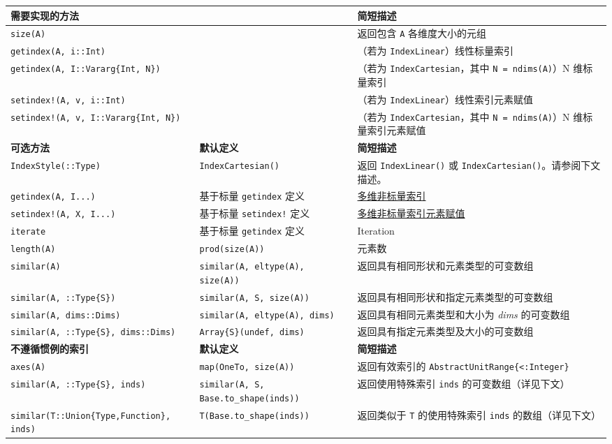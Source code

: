 \begin{table}[h]

\begin{tabulary}{\linewidth}{|L|L|L|}
\hline
需要实现的方法 &  & 简短描述 \\
\hline
\texttt{size(A)} &  & 返回包含 \texttt{A} 各维度大小的元组 \\
\hline
\texttt{getindex(A, i::Int)} &  & （若为 \texttt{IndexLinear}）线性标量索引 \\
\hline
\texttt{getindex(A, I::Vararg\{Int, N\})} &  & （若为 \texttt{IndexCartesian}，其中 \texttt{N = ndims(A)}）N 维标量索引 \\
\hline
\texttt{setindex!(A, v, i::Int)} &  & （若为 \texttt{IndexLinear}）线性索引元素赋值 \\
\hline
\texttt{setindex!(A, v, I::Vararg\{Int, N\})} &  & （若为 \texttt{IndexCartesian}，其中 \texttt{N = ndims(A)}）N 维标量索引元素赋值 \\
\hline
\textbf{可选方法} & \textbf{默认定义} & \textbf{简短描述} \\
\hline
\texttt{IndexStyle(::Type)} & \texttt{IndexCartesian()} & 返回 \texttt{IndexLinear()} 或 \texttt{IndexCartesian()}。请参阅下文描述。 \\
\hline
\texttt{getindex(A, I...)} & 基于标量 \texttt{getindex} 定义 & \hyperlink{16717190941363337071}{多维非标量索引} \\
\hline
\texttt{setindex!(A, X, I...)} & 基于标量 \texttt{setindex!} 定义 & \hyperlink{16717190941363337071}{多维非标量索引元素赋值} \\
\hline
\texttt{iterate} & 基于标量 \texttt{getindex} 定义 & Iteration \\
\hline
\texttt{length(A)} & \texttt{prod(size(A))} & 元素数 \\
\hline
\texttt{similar(A)} & \texttt{similar(A, eltype(A), size(A))} & 返回具有相同形状和元素类型的可变数组 \\
\hline
\texttt{similar(A, ::Type\{S\})} & \texttt{similar(A, S, size(A))} & 返回具有相同形状和指定元素类型的可变数组 \\
\hline
\texttt{similar(A, dims::Dims)} & \texttt{similar(A, eltype(A), dims)} & 返回具有相同元素类型和大小为 \emph{dims} 的可变数组 \\
\hline
\texttt{similar(A, ::Type\{S\}, dims::Dims)} & \texttt{Array\{S\}(undef, dims)} & 返回具有指定元素类型及大小的可变数组 \\
\hline
\textbf{不遵循惯例的索引} & \textbf{默认定义} & \textbf{简短描述} \\
\hline
\texttt{axes(A)} & \texttt{map(OneTo, size(A))} & 返回有效索引的 \texttt{AbstractUnitRange\{<:Integer\}} \\
\hline
\texttt{similar(A, ::Type\{S\}, inds)} & \texttt{similar(A, S, Base.to\_shape(inds))} & 返回使用特殊索引 \texttt{inds} 的可变数组（详见下文） \\
\hline
\texttt{similar(T::Union\{Type,Function\}, inds)} & \texttt{T(Base.to\_shape(inds))} & 返回类似于 \texttt{T} 的使用特殊索引 \texttt{inds} 的数组（详见下文） \\
\hline
\end{tabulary}

\end{table}



